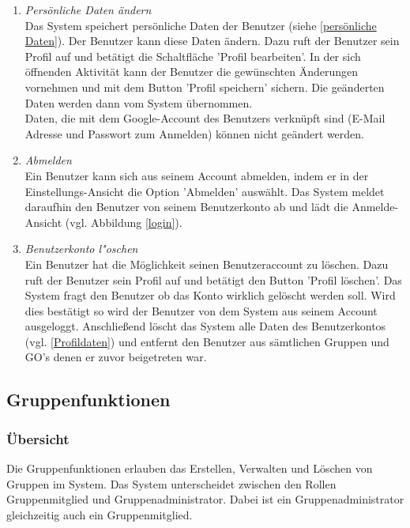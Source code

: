 \documentclass[parskip=full]{scrartcl}
\def\threedigits#1{%
  \ifnum#1<100 0\fi
  \ifnum#1<10 0\fi
  \number#1}
\begin{document}
\begin{enumerate}[label={\textbf{/F\protect\threedigits{\theenumi}0/}}, leftmargin=*]
	\item \colorbox{shadecolor}{\textit{Persönliche Daten ändern}\label{Persönliche Daten ändern}} \\ Das System speichert persönliche Daten der Benutzer (siehe  \ref{persönliche Daten}). Der Benutzer kann diese Daten ändern. Dazu ruft der Benutzer sein Profil auf und betätigt die Schaltfläche 'Profil bearbeiten'. In der sich öffnenden Aktivität kann der Benutzer die gewünschten Änderungen vornehmen und mit dem Button 'Profil speichern' sichern. Die geänderten Daten werden dann vom System übernommen.\\
Daten, die mit dem Google-Account des Benutzers verknüpft sind (E-Mail Adresse und Passwort zum Anmelden) können nicht geändert werden.
	
	\item \textit{Abmelden}\label{Abmelden} \\ Ein Benutzer kann sich aus seinem Account abmelden, indem er in der Einstellungs-Ansicht die Option 'Abmelden' auswählt. Das System meldet daraufhin den Benutzer von seinem Benutzerkonto ab und lädt die Anmelde-Ansicht (vgl. Abbildung \ref{login}).
	
	\item \textit{Benutzerkonto l"oschen}\label{Benutzerkonto löschen}\\
	Ein Benutzer hat die Möglichkeit seinen Benutzeraccount zu löschen. Dazu ruft der Benutzer sein Profil auf und betätigt den Button 'Profil löschen'. Das System fragt den Benutzer ob das Konto wirklich gelöscht werden soll. Wird dies bestätigt so wird der Benutzer von dem System aus seinem Account ausgeloggt. Anschließend löscht das System alle Daten des Benutzerkontos (vgl. \ref{Profildaten}) und entfernt den Benutzer aus sämtlichen Gruppen und GO's denen er zuvor beigetreten war.
\end{enumerate}

\subsection{Gruppenfunktionen}

\subsubsection{Übersicht}
Die Gruppenfunktionen erlauben das Erstellen, Verwalten und Löschen von Gruppen im System. Das System unterscheidet zwischen den Rollen Gruppenmitglied und Gruppenadministrator. Dabei ist ein Gruppenadministrator gleichzeitig auch ein Gruppenmitglied.
\end{document}
